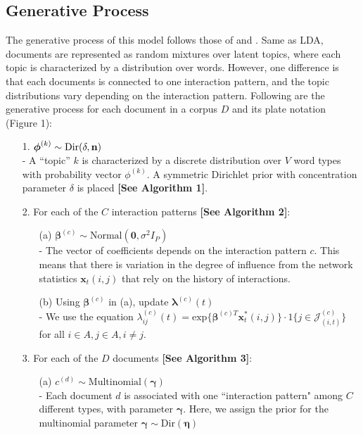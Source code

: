 \documentclass[a4paper]{article}
\begin{document}
\subsection{Generative Process}
The generative process of this model follows those of \cite{Blei2003} and \cite{rosen2004author}. Same as LDA, documents are represented as random mixtures over latent topics, where each topic is characterized by a distribution over words. However, one difference is that each documents is connected to one interaction pattern, and the topic distributions vary depending on the interaction pattern. Following are the generative process for each document in a corpus $D$ and its plate notation (Figure 1):
\begin{itemize}
	\item[1.] {$\boldsymbol{\phi}^{(k)} \sim \mbox{Dir}(\delta, \bf n)$}\\
	- A “topic” $k$ is characterized by a discrete distribution over $V$ word types with probability vector $\phi^{(k)}$. A symmetric Dirichlet prior with concentration parameter $\delta$ is placed \textbf{[See Algorithm 1]}.
\item[2.] For each of the $C$ interaction patterns \textbf{[See Algorithm 2]}:
\begin{itemize}
	\item[(a)] $\boldsymbol{\beta}^{(c)}\sim \mbox{Normal}(\textbf{0}, \sigma^2I_P)$\\ 
	- The vector of coefficients depends on the interaction pattern $c$. This means that there is variation in the degree of influence from the network statistics $\boldsymbol{x}_t(i, j)$ that rely on the history of interactions.
	\item[(b)] Using $\boldsymbol{\beta}^{(c)}$ in (a), update $\boldsymbol{\lambda}^{(c)}(t)$\\
	- We use the equation $\lambda^{(c)}_{ij}(t)= \mbox{exp}\Big\{\boldsymbol{\beta}^{(c)T}\boldsymbol{x}^*_t(i, j)\Big\}\cdot 1\{j \in \mathcal{J}^{(c)}_{(i, t)}\}$ for all $i \in A, j \in A, i\neq j$.
\end{itemize}
\item[3.] For each of the $D$ documents \textbf{[See Algorithm 3]}:
\begin{itemize}
	\item[(a)] $c^{(d)}\sim \mbox{Multinomial}(\boldsymbol{\gamma})$\\
	- Each document $d$ is associated with one ``interaction pattern" among $C$ different types, with parameter $\boldsymbol{\gamma}$. Here, we assign the prior for the multinomial parameter $\boldsymbol{\gamma} \sim \mbox{Dir}(\boldsymbol{\eta})$

\end{itemize}
\end{itemize}
\end{document}
